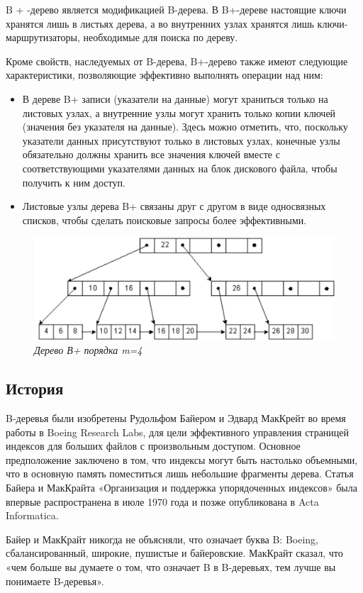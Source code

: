 \documentclass{article}
\begin{document}
B + -дерево является модификацией B-дерева. В B+-дереве настоящие ключи хранятся лишь в листьях дерева, а во внутренних узлах хранятся лишь ключи-маршрутизаторы, необходимые для поиска по дереву. 

Кроме свойств, наследуемых от B-дерева, B+-дерево также имеют следующие характеристики, позволяющие эффективно выполнять операции над ним:
\begin{itemize}
\item В дереве B+ записи (указатели на данные) могут храниться только на листовых узлах, а внутренние узлы могут хранить только копии ключей (значения без указателя на данные).  Здесь можно отметить, что, поскольку указатели данных присутствуют только в листовых узлах, конечные узлы обязательно должны хранить все значения ключей вместе с соответствующими указателями данных на блок дискового файла, чтобы получить к ним доступ. 
\item Листовые узлы дерева B+ связаны друг с другом в виде односвязных списков, чтобы сделать поисковые запросы более эффективными. 
\end{itemize}

\begin{figure}
\includegraphics[scale=0.5]{2.png}
\caption{\textit{Дерево В+ порядка m=4}}
\end{figure}

\subsection{История}
B-деревья были изобретены Рудольфом Байером и Эдвард МакКрейт во время работы в Boeing Research Labs, для цели эффективного управления страницей индексов для больших файлов с произвольным доступом. Основное предположение заключено в том, что индексы могут быть настолько объемными, что в основную память поместиться лишь небольшие фрагменты дерева. Статья Байера и МакКрайта «Организация и поддержка упорядоченных индексов» была впервые распространена в июле 1970 года и позже опубликована в Acta Informatica.

Байер и МакКрайт никогда не объясняли, что означает буква B: Boeing, сбалансированный, широкие, пушистые и байеровские. МакКрайт сказал, что «чем больше вы думаете о том, что означает B в B-деревьях, тем лучше вы понимаете B-деревья».
\end{document}
